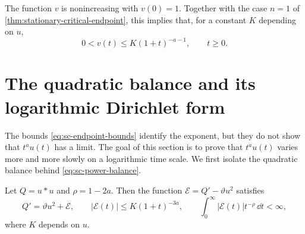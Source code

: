 The function $v$ is nonincreasing with $v(0)=1$. Together with the case $n=1$ of \cref{thm:stationary-critical-endpoint}, this implies that, for a constant $K$ depending on $u$,
\begin{equation}\label{eq:sc-v-bound}
 0<v(t)\le K(1+t)^{-a-1},\qquad t\ge0 .
\end{equation}

\section{The quadratic balance and its logarithmic Dirichlet form}
\label{subsec:sc-dirichlet}

The bounds \eqref{eq:sc-endpoint-bounds} identify the exponent, but they do not show that $t^au(t)$ has a limit. The goal of this section is to prove that $t^au(t)$ varies more and more slowly on a logarithmic time scale. We first isolate the quadratic balance behind \eqref{eq:sc-power-balance}.

\begin{lemma}
\label{lem:stationary-critical-balance-error}
Let $Q=u*u$ and $\rho=1-2a$. Then the function $\mathcal E=Q'-\vartheta u^2$ satisfies
\begin{equation}
 Q'=\vartheta u^2+\mathcal E,
 \qquad |\mathcal E(t)|\le K(1+t)^{-3a},\qquad
 \int_0^\infty|\mathcal E(t)|t^{-\rho}\,\dd t<\infty,
 \label{eq:sc-quadratic-balance}
\end{equation}
where $K$ depends on $u$.
\end{lemma}

